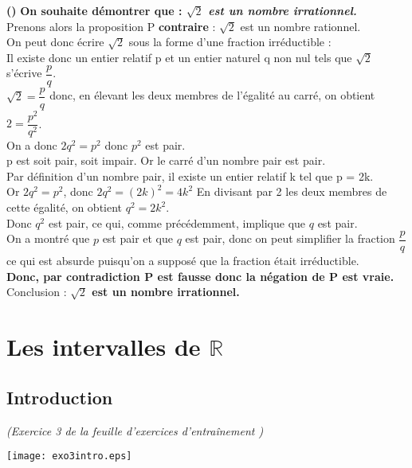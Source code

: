 \documentclass[a4paper,14pt,twoside,french]{extarticle}
\newcounter{enumtaba}
\newcommand{\qa}{\textbf{\stepcounter{enumtaba} (\alph{enumtaba})} }
\newcounter{exo}
\begin{document}
\qa\textbf{ On souhaite démontrer que : \textit{$\sqrt{2}$ est  un nombre irrationnel.}}\\
\color{purple}
Prenons alors la proposition P \textbf{contraire} : $\sqrt{2}$ est un nombre rationnel.\\
On peut donc écrire $\sqrt{2}$  sous la forme d'une fraction irréductible :\\
Il existe donc un entier relatif p et un entier naturel q non nul tels que  
$\sqrt{2}$ s'écrive  $\dfrac{p}{q}$.\\
$\sqrt{2}=\dfrac{p}{q}$ donc, en élevant les deux membres de l’égalité au carré, on obtient $2=\dfrac{p^{2}}{q^{2}}$.\\
On a donc $2q^{2}=p^{2}$ donc $p^{2}$ est pair.\\
p est soit pair, soit impair. Or le carré d’un nombre pair est pair. \\
Par définition d’un nombre pair, il existe un entier relatif k tel que p = 2k.\\
Or $2q^{2}=p^{2}$, donc $2q^{2}=(2k)^{2}=4k^{2}$
En divisant par 2 les deux membres de cette égalité, on obtient $q^{2}=2k^{2}$.\\
Donc $q^{2}$ est pair, ce qui, comme précédemment, implique que $q$ est pair.\\

On a montré que $p$ est pair et que $q$ est pair, donc on peut simplifier la fraction $\dfrac{p}{q}$ ce qui est absurde puisqu’on a supposé que la fraction était irréductible.\\

\textbf{Donc, par contradiction P est fausse donc la négation de P est vraie.}\\

Conclusion : \textbf{$\sqrt{2}$ est  un nombre irrationnel.}


\color{black}
\newpage

 \section{Les intervalles de $\mathbb{R}$}

\subsection{Introduction}

\textit{(Exercice 3 de la feuille d'exercices d'entraînement )}
\begin{flushleft}
\texttt{[image: exo3intro.eps]} 
\end{flushleft}
\end{document}
